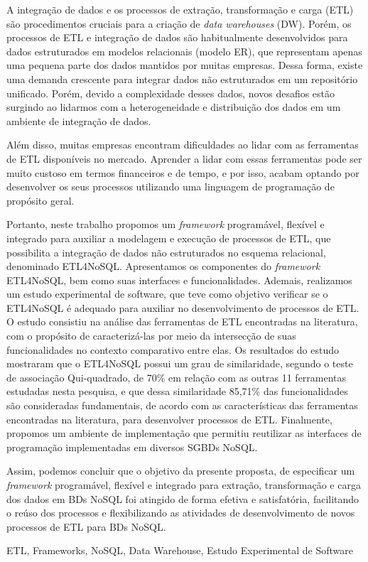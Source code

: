 
A integração de dados e os processos de extração, transformação e carga (ETL) são procedimentos cruciais para a criação de \textit{data warehouses} (DW). Porém, os processos de ETL e integração de dados são habitualmente desenvolvidos para dados estruturados em modelos relacionais (modelo ER), que representam apenas uma pequena parte dos dados mantidos por muitas empresas. Dessa forma, existe uma demanda crescente para integrar dados não estruturados em um repositório unificado. Porém, devido a complexidade desses dados, novos desafios estão surgindo ao lidarmos com a heterogeneidade e distribuição dos dados em um ambiente de integração de dados.

Além disso, muitas empresas encontram dificuldades ao lidar com as ferramentas de ETL disponíveis no mercado. Aprender a lidar com essas ferramentas pode ser muito custoso em termos financeiros e de tempo, e por isso, acabam optando por desenvolver os seus processos utilizando uma linguagem de programação de propósito geral.

Portanto, neste trabalho propomos um \textit{framework} programável, flexível e integrado para auxiliar a modelagem e execução de processos de ETL, que possibilita a integração de dados não estruturados no esquema relacional, denominado ETL4NoSQL. Apresentamos os componentes do \textit{framework} ETL4NoSQL, bem como suas interfaces e funcionalidades. Ademais, realizamos um estudo experimental de software, que teve como objetivo verificar se o ETL4NoSQL é adequado para auxiliar no desenvolvimento de processos de ETL. O estudo consistiu na análise das ferramentas de ETL encontradas na literatura, com o propósito de caracterizá-las por meio da intersecção de suas funcionalidades no contexto comparativo entre elas. Os resultados do estudo mostraram que o ETL4NoSQL possui um grau de similaridade, segundo o teste de associação Qui-quadrado, de 70\% em relação com as outras 11 ferramentas estudadas nesta pesquisa, e que dessa similaridade 85,71\% das funcionalidades são consideradas fundamentais, de acordo com as características das ferramentas encontradas na literatura, para desenvolver processos de ETL. Finalmente, propomos um ambiente de implementação que permitiu reutilizar as interfaces de programação implementadas em diversos SGBDs NoSQL.

Assim, podemos concluir que o objetivo da presente proposta, de especificar um \textit{framework} programável, flexível e integrado para extração, transformação e carga dos dados em BDs NoSQL foi atingido de forma efetiva e satisfatória, facilitando o reúso dos processos e flexibilizando as atividades de desenvolvimento de novos processos de ETL para BDs NoSQL.

\begin{keywords}
ETL, Frameworks, NoSQL, Data Warehouse, Estudo Experimental de Software
\end{keywords}